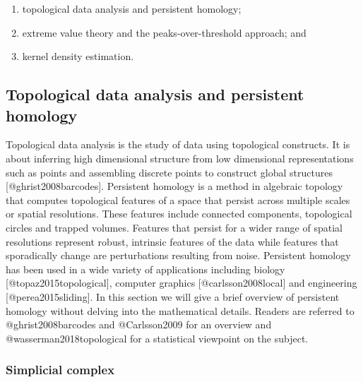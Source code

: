 \documentclass[
]{article}
\providecommand{\tightlist}{%
  \setlength{\itemsep}{0pt}\setlength{\parskip}{0pt}}
\begin{document}
\begin{enumerate}
\def\labelenumi{\arabic{enumi}.}
\tightlist
\item
  topological data analysis and persistent homology;
\item
  extreme value theory and the peaks-over-threshold approach; and
\item
  kernel density estimation.
\end{enumerate}

\hypertarget{subsec:tda}{%
\subsection{Topological data analysis and persistent
homology}\label{subsec:tda}}

Topological data analysis is the study of data using topological
constructs. It is about inferring high dimensional structure from low
dimensional representations such as points and assembling discrete
points to construct global structures {[}@ghrist2008barcodes{]}.
Persistent homology is a method in algebraic topology that computes
topological features of a space that persist across multiple scales or
spatial resolutions. These features include connected components,
topological circles and trapped volumes. Features that persist for a
wider range of spatial resolutions represent robust, intrinsic features
of the data while features that sporadically change are perturbations
resulting from noise. Persistent homology has been used in a wide
variety of applications including biology {[}@topaz2015topological{]},
computer graphics {[}@carlsson2008local{]} and engineering
{[}@perea2015sliding{]}. In this section we will give a brief overview
of persistent homology without delving into the mathematical details.
Readers are referred to @ghrist2008barcodes and @Carlsson2009 for an
overview and @wasserman2018topological for a statistical viewpoint on
the subject.

\hypertarget{simplicial-complex}{%
\subsubsection*{Simplicial complex}\label{simplicial-complex}}
\end{document}
